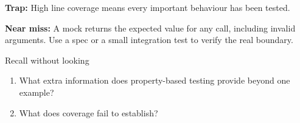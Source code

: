 \documentclass[11pt]{article}
\begin{document}
\begin{keepsection}
\begin{notebox}\textbf{Trap:} High line coverage means every important behaviour has been tested.\end{notebox}

\begin{notebox}\textbf{Near miss:} A mock returns the expected value for any call, including invalid arguments. Use a spec or a small integration test to verify the real boundary.\end{notebox}

\begin{recallbox}{Recall without looking}
\begin{enumerate}
\item What extra information does property-based testing provide beyond one example?
\item What does coverage fail to establish?
\end{enumerate}

\end{recallbox}
\end{keepsection}
\end{document}
